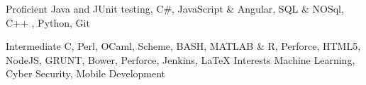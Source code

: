 

\begin{cvskills}

  \cvskill
    {Proficient} %
    {Java and JUnit testing, C\#, JavaScript \& Angular, SQL \& NOSql, C++ , Python, Git} %

  \cvskill
    {Intermediate} %
    {C, Perl, OCaml, Scheme, BASH, MATLAB \& R, Perforce, HTML5, NodeJS, GRUNT, Bower, Perforce, Jenkins, LaTeX } %
  \cvskill
    {Interests} %
    {Machine Learning, Cyber Security, Mobile Development} %
    
   
    

\end{cvskills}
